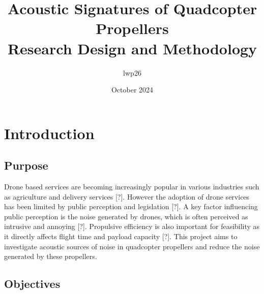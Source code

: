 \documentclass{article}
\begin{document}
\title{Acoustic Signatures of Quadcopter Propellers \\ Research Design and Methodology}
\author{lwp26}
\date{October 2024}
\maketitle 

\section{Introduction}

\subsection{Purpose}
Drone based services are becoming increasingly popular in various industries such as agriculture and delivery services [?].
However the adoption of drone services has been limited by public perception and legislation [?].
A key factor influencing public perception is the noise generated by drones, which is often perceived as intrusive and annoying [?].
Propulsive efficiency is also important for feasibility as it directly affects flight time and payload capacity [?].
This project aims to investigate acoustic sources of noise in quadcopter propellers and reduce the noise generated by these propellers.




\subsection{Objectives}
\end{document}
